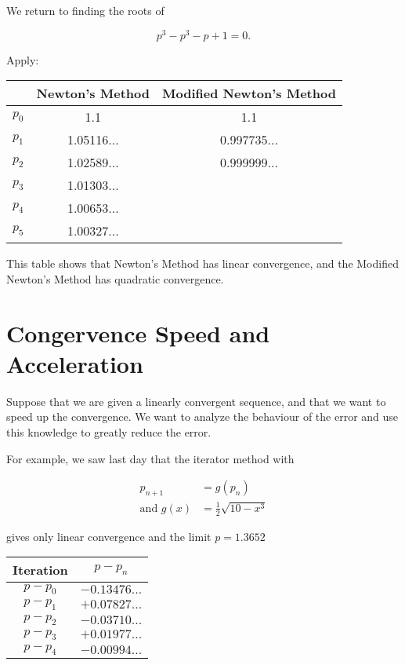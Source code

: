 We return to finding the roots of

\[
p^3 - p^3 - p + 1 = 0
.\]

Apply:

\begin{table}[h]
    \centering
    \begin{tabular}{c c c}
        \toprule
         & Newton's Method & Modified Newton's Method \\
        \midrule
        $p_0$ & 1.1 & 1.1 \\
        $p_1$ & 1.05116... & 0.997735... \\
        $p_2$ & 1.02589... & 0.999999... \\
        $p_3$ & 1.01303... &  \\
        $p_4$ & 1.00653... &  \\
        $p_5$ & 1.00327... &  \\
        \bottomrule
    \end{tabular}
\end{table}

This table shows that Newton's Method has linear convergence, and the Modified
Newton's Method has quadratic convergence.

\section{Congervence Speed and Acceleration}

Suppose that we are given a linearly convergent sequence, and that we want to
speed up the convergence. We want to analyze the behaviour of the error and use
this knowledge to greatly reduce the error. 

For example, we saw last day that the iterator method with 

\begin{align*}
  p_{n+1} &= g(p_n) \\
  \text{and } g(x) &= \frac{1}{2}\sqrt{10-x^3}
\end{align*}

gives only linear convergence and the limit $p=1.3652$

\begin{table}[h]
    \centering
    \begin{tabular}{c c}
        \toprule
        Iteration & $p - p_n$ \\
        \midrule
        $p - p_0$ & $-0.13476\ldots$ \\
        $p - p_1$ & $+0.07827\ldots$ \\
        $p - p_2$ & $-0.03710\ldots$ \\
        $p - p_3$ & $+0.01977\ldots$ \\
        $p - p_4$ & $-0.00994\ldots$ \\
        \bottomrule
    \end{tabular}
\end{table}

